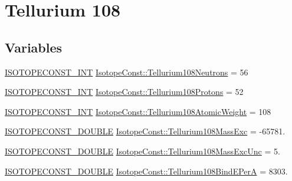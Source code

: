\hypertarget{group___isotope_const-_tellurium-_te108}{}\section{Tellurium 108}
\label{group___isotope_const-_tellurium-_te108}
\subsection*{Variables}
\begin{DoxyCompactItemize}
\item 
\mbox{\hyperlink{group___isotope_const-_macros_ga5f18360b3e99483a35c32d789e62621c}{I\+S\+O\+T\+O\+P\+E\+C\+O\+N\+S\+T\+\_\+\+I\+NT}} \mbox{\hyperlink{group___isotope_const-_tellurium-_te108_gaf9d084e227d663682deaf54f37b347a9}{Isotope\+Const\+::\+Tellurium108\+Neutrons}} = 56
\item 
\mbox{\hyperlink{group___isotope_const-_macros_ga5f18360b3e99483a35c32d789e62621c}{I\+S\+O\+T\+O\+P\+E\+C\+O\+N\+S\+T\+\_\+\+I\+NT}} \mbox{\hyperlink{group___isotope_const-_tellurium-_te108_ga767ca344c40437d791b3833fa96869e4}{Isotope\+Const\+::\+Tellurium108\+Protons}} = 52
\item 
\mbox{\hyperlink{group___isotope_const-_macros_ga5f18360b3e99483a35c32d789e62621c}{I\+S\+O\+T\+O\+P\+E\+C\+O\+N\+S\+T\+\_\+\+I\+NT}} \mbox{\hyperlink{group___isotope_const-_tellurium-_te108_ga0b0342b6f83d4c37abc384e049827da2}{Isotope\+Const\+::\+Tellurium108\+Atomic\+Weight}} = 108
\item 
\mbox{\hyperlink{group___isotope_const-_macros_ga8f45a7272ce02c0b4c65c44636ed719a}{I\+S\+O\+T\+O\+P\+E\+C\+O\+N\+S\+T\+\_\+\+D\+O\+U\+B\+LE}} \mbox{\hyperlink{group___isotope_const-_tellurium-_te108_gacee0f3c162c16f19442b01ae34e2942d}{Isotope\+Const\+::\+Tellurium108\+Mass\+Exc}} = -\/65781.
\item 
\mbox{\hyperlink{group___isotope_const-_macros_ga8f45a7272ce02c0b4c65c44636ed719a}{I\+S\+O\+T\+O\+P\+E\+C\+O\+N\+S\+T\+\_\+\+D\+O\+U\+B\+LE}} \mbox{\hyperlink{group___isotope_const-_tellurium-_te108_ga1a0945dfc114f9998a501945479aa33d}{Isotope\+Const\+::\+Tellurium108\+Mass\+Exc\+Unc}} = 5.
\item 
\mbox{\hyperlink{group___isotope_const-_macros_ga8f45a7272ce02c0b4c65c44636ed719a}{I\+S\+O\+T\+O\+P\+E\+C\+O\+N\+S\+T\+\_\+\+D\+O\+U\+B\+LE}} \mbox{\hyperlink{group___isotope_const-_tellurium-_te108_ga8704f8e555fdd22dfd1410c8a173a4a3}{Isotope\+Const\+::\+Tellurium108\+Bind\+E\+PerA}} = 8303.
\item 

\end{DoxyCompactItemize}
